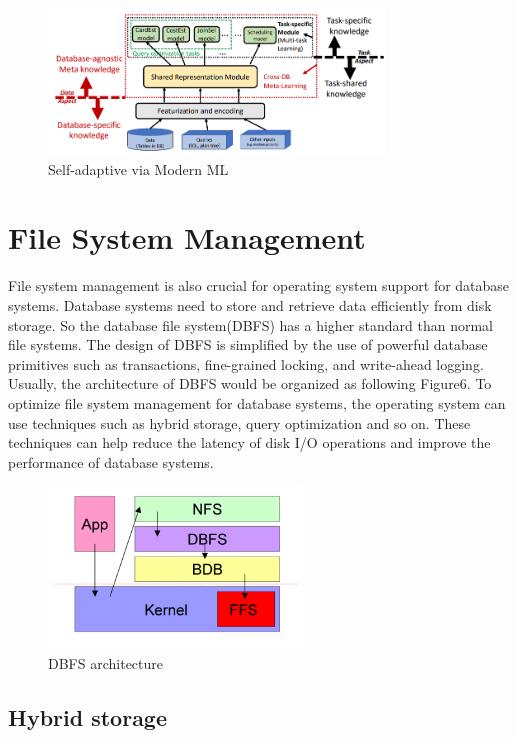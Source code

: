 \documentclass[11pt,a4paper]{article}
\begin{document}
\begin{figure}[h!]
    \centering
    \includegraphics[width=0.8\textwidth]{mlpre.png}
    \caption{Self-adaptive via Modern ML}
\end{figure}

\section{File System Management}

File system management is also crucial for operating system support for database systems.
Database systems need to store and retrieve data efficiently from disk storage.
So the database file system(DBFS) has a higher standard than normal file systems.
The design of DBFS is simplified by the use of powerful database primitives such as transactions, fine-grained locking, and write-ahead logging.\cite{10.14778/2536360.2536361}
Usually, the architecture of DBFS would be organized as following Figure6.
To optimize file system management for database systems, the operating system can use techniques such as hybrid storage, query optimization and so on.
These techniques can help reduce the latency of disk I/O operations and improve the performance of database systems.

\begin{figure}[h!]
    \centering
    \includegraphics[width=0.6\textwidth]{dbfsarch.png}
    \caption{DBFS architecture}
\end{figure}

\subsection{Hybrid storage}
\end{document}
